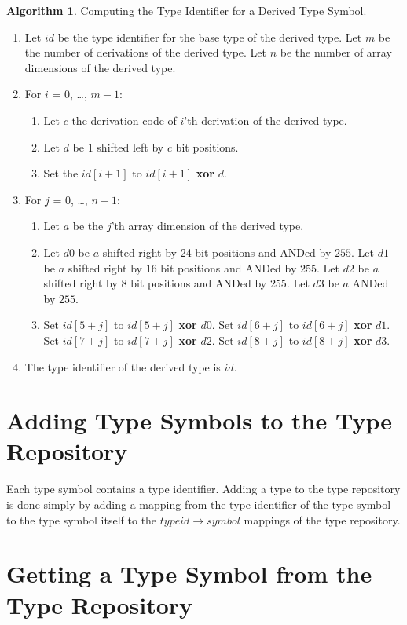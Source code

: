 \documentclass[a4paper,oneside,11pt]{book}
\theoremstyle{definition}
\newtheorem{algo}{Algorithm}[section]
\begin{document}
\begin{algo}\label{derivedtypeid} Computing the Type Identifier for a Derived Type Symbol.
\begin{enumerate}
\item
Let $id$ be the type identifier for the base type of the derived type.
Let $m$ be the number of derivations of the derived type.
Let $n$ be the number of array dimensions of the derived type.
\item
For $i$ = 0, \ldots, $m-1$:
\begin{enumerate}
\item
Let $c$ the derivation code of $i$'th derivation of the derived type.
\item
Let $d$ be 1 shifted left by $c$ bit positions.
\item
Set the $id[i + 1]$ to $id[i + 1]$ \textbf{xor} $d$.
\end{enumerate}
\item
For $j$ = 0, \ldots, $n - 1$:
\begin{enumerate}
\item
Let $a$ be the $j$'th array dimension of the derived type.
\item
Let $d0$ be $a$ shifted right by 24 bit positions and ANDed by $255$.
Let $d1$ be $a$ shifted right by 16 bit positions and ANDed by $255$.
Let $d2$ be $a$ shifted right by 8 bit positions and ANDed by $255$.
Let $d3$ be $a$ ANDed by $255$.
\item
Set $id[5 + j]$ to $id[5 + j]$ \textbf{xor} $d0$.
Set $id[6 + j]$ to $id[6 + j]$ \textbf{xor} $d1$.
Set $id[7 + j]$ to $id[7 + j]$ \textbf{xor} $d2$.
Set $id[8 + j]$ to $id[8 + j]$ \textbf{xor} $d3$.
\end{enumerate}
\item
The type identifier of the derived type is $id$.
\end{enumerate}
\end{algo}

\section{Adding Type Symbols to the Type Repository}

Each type symbol contains a type identifier.
Adding a type to the type repository is done simply by adding a mapping from the type identifier of the type symbol to the type symbol itself to the
$typeid \rightarrow symbol$ mappings of the type repository.

\section{Getting a Type Symbol from the Type Repository}
\end{document}
